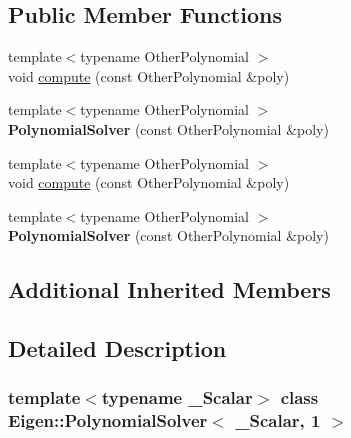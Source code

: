 \subsection*{Public Member Functions}
\begin{DoxyCompactItemize}
\item 
{\footnotesize template$<$typename Other\+Polynomial $>$ }\\void \hyperlink{class_eigen_1_1_polynomial_solver_3_01___scalar_00_011_01_4_ac10c32870abba4461d681506eaa63e18}{compute} (const Other\+Polynomial \&poly)
\item 
\mbox{\label{class_eigen_1_1_polynomial_solver_3_01___scalar_00_011_01_4_a44e3570b90b70da1a037d7415b96b5fe}} 
{\footnotesize template$<$typename Other\+Polynomial $>$ }\\{\bfseries Polynomial\+Solver} (const Other\+Polynomial \&poly)
\item 
{\footnotesize template$<$typename Other\+Polynomial $>$ }\\void \hyperlink{class_eigen_1_1_polynomial_solver_3_01___scalar_00_011_01_4_ac10c32870abba4461d681506eaa63e18}{compute} (const Other\+Polynomial \&poly)
\item 
\mbox{\label{class_eigen_1_1_polynomial_solver_3_01___scalar_00_011_01_4_a44e3570b90b70da1a037d7415b96b5fe}} 
{\footnotesize template$<$typename Other\+Polynomial $>$ }\\{\bfseries Polynomial\+Solver} (const Other\+Polynomial \&poly)
\end{DoxyCompactItemize}
\subsection*{Additional Inherited Members}


\subsection{Detailed Description}
\subsubsection*{template$<$typename \+\_\+\+Scalar$>$\newline
class Eigen\+::\+Polynomial\+Solver$<$ \+\_\+\+Scalar, 1 $>$}



